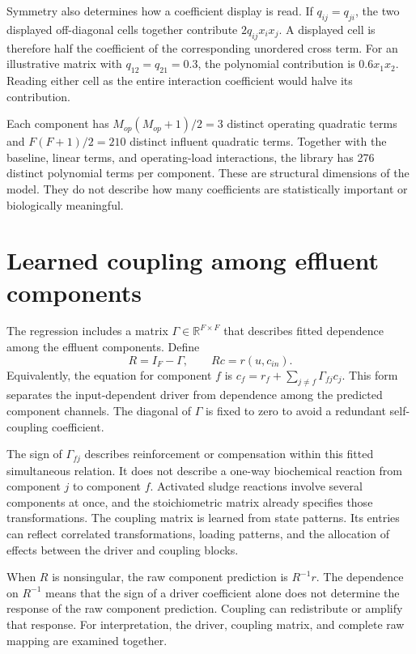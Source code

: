 Symmetry also determines how a coefficient display is read. If \(q_{ij}=q_{ji}\), the two displayed off-diagonal cells together contribute \(2q_{ij}x_i x_j\). A displayed cell is therefore half the coefficient of the corresponding unordered cross term. For an illustrative matrix with \(q_{12}=q_{21}=0.3\), the polynomial contribution is \(0.6x_1x_2\). Reading either cell as the entire interaction coefficient would halve its contribution.

Each component has \(M_{op}(M_{op}+1)/2=3\) distinct operating quadratic terms and \(F(F+1)/2=210\) distinct influent quadratic terms. Together with the baseline, linear terms, and operating-load interactions, the library has 276 distinct polynomial terms per component. These are structural dimensions of the model. They do not describe how many coefficients are statistically important or biologically meaningful.

\section{Learned coupling among effluent components}

The regression includes a matrix \(\Gamma\in\mathbb{R}^{F\times F}\) that describes fitted dependence among the effluent components. Define
\begin{equation}
\label{eq:icsor_coupled_relation}
R=I_F-\Gamma,
\qquad Rc=r(u,c_{in}).
\end{equation}
Equivalently, the equation for component \(f\) is \(c_f=r_f+\sum_{j\neq f}\Gamma_{fj}c_j\). This form separates the input-dependent driver from dependence among the predicted component channels. The diagonal of \(\Gamma\) is fixed to zero to avoid a redundant self-coupling coefficient.

The sign of \(\Gamma_{fj}\) describes reinforcement or compensation within this fitted simultaneous relation. It does not describe a one-way biochemical reaction from component \(j\) to component \(f\). Activated sludge reactions involve several components at once, and the stoichiometric matrix already specifies those transformations. The coupling matrix is learned from state patterns. Its entries can reflect correlated transformations, loading patterns, and the allocation of effects between the driver and coupling blocks.

When \(R\) is nonsingular, the raw component prediction is \(R^{-1}r\). The dependence on \(R^{-1}\) means that the sign of a driver coefficient alone does not determine the response of the raw component prediction. Coupling can redistribute or amplify that response. For interpretation, the driver, coupling matrix, and complete raw mapping are examined together.

